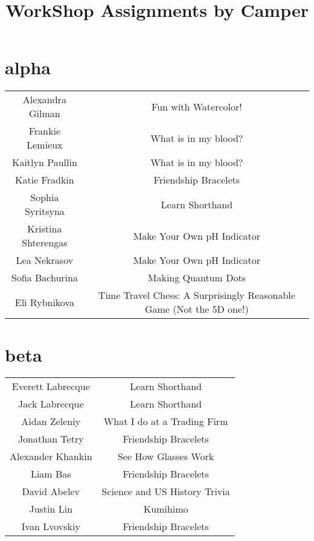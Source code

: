 \documentclass{article}
\title{WorkShop Assignments by Camper}
\author{}
\date{}
\begin{document}
\maketitle
\centering
\section*{alpha}
\setlength{\tabcolsep}{60pt}
\begin{tabular}{c c}
Alexandra Gilman & Fun with Watercolor! \\
Frankie Lemieux & What is in my blood? \\
Kaitlyn Paullin & What is in my blood? \\
Katie Fradkin & Friendship Bracelets \\
Sophia Syritsyna & Learn Shorthand \\
Kristina Shterengas & Make Your Own pH Indicator \\
Lea Nekrasov & Make Your Own pH Indicator \\
Sofia Bachurina & Making Quantum Dots \\
Eli Rybnikova & Time Travel Chess: A Surprisingly Reasonable Game (Not the 5D one!) \\
\end{tabular}
\section*{beta}
\setlength{\tabcolsep}{60pt}
\begin{tabular}{c c}
Everett Labrecque & Learn Shorthand \\
Jack Labrecque & Learn Shorthand \\
Aidan Zeleniy & What I do at a Trading Firm \\
Jonathan Tetry & Friendship Bracelets \\
Alexander Khankin & See How Glasses Work \\
Liam Bas & Friendship Bracelets \\
David Abelev & Science and US History Trivia \\
Justin Lin & Kumihimo \\
Ivan Lvovskiy & Friendship Bracelets \\
\end{tabular}
\end{document}
